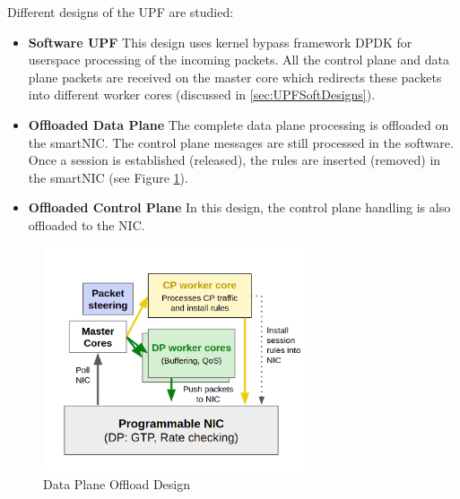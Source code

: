 Different designs of the UPF are studied:
\begin{itemize}
	\item \textbf{Software UPF} This design uses kernel bypass framework DPDK for userspace processing of the incoming packets. All the control plane and data plane packets are received on the master core which redirects these packets into different worker cores 
	(discussed in  \ref{sec:UPFSoftDesigns}).
	\item \textbf{Offloaded Data Plane}
	The complete data plane processing is offloaded on the smartNIC. The control plane messages are still processed in the software. Once a session is established (released), the rules are inserted (removed) in the smartNIC (see Figure \ref{fig:DPOffloadArchitecture}).
	\item \textbf{Offloaded Control Plane}
	In this design, the control plane handling is also offloaded to the NIC. 
\end{itemize}
\begin{figure}[htbp]
    \centering
    \includegraphics[width=0.7\textwidth, keepaspectratio]{./fig/DPOffload.png}
    \caption{Data Plane Offload Design}
    \label{fig:DPOffloadArchitecture}
\end{figure}

